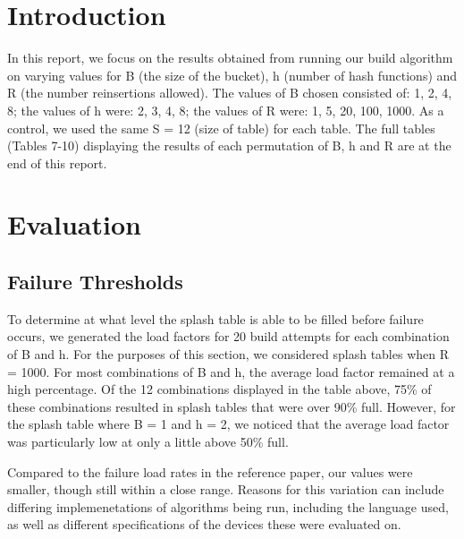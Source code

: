 \documentclass[11pt]{article}
\author{\auth}
\title{\class}
\begin{document}
\setlength{\parskip}{.1 in}

\maketitle
\newpage

\section*{Introduction}

In this report, we focus on the results obtained from running our build algorithm on varying values for B (the size of the bucket), h (number of hash functions) and R (the number reinsertions allowed).
The values of B chosen consisted of: 1, 2, 4, 8; the values of h were: 2, 3, 4, 8; the values of R were: 1, 5, 20, 100, 1000.
As a control, we used the same S = 12 (size of table) for each table.
The full tables (Tables 7-10) displaying the results of each permutation of B, h and R are at the end of this report.

\section*{Evaluation}

\subsection*{Failure Thresholds}
To determine at what level the splash table is able to be filled before failure occurs, we generated the load factors for 20 build attempts for each combination of B and h.
For the purposes of this section, we considered splash tables when R = 1000.
For most combinations of B and h, the average load factor remained at a high percentage.
Of the 12 combinations displayed in the table above, 75\% of these combinations resulted in splash tables that were over 90\% full.
However, for the splash table where B = 1 and h = 2, we noticed that the average load factor was particularly low at only a little above 50\% full.

Compared to the failure load rates in the reference paper, our values were smaller, though still within a close range. Reasons for this variation can include differing implemenetations of algorithms being run, including the language used, as well as different specifications of the devices these were evaluated on. 
\end{document}
